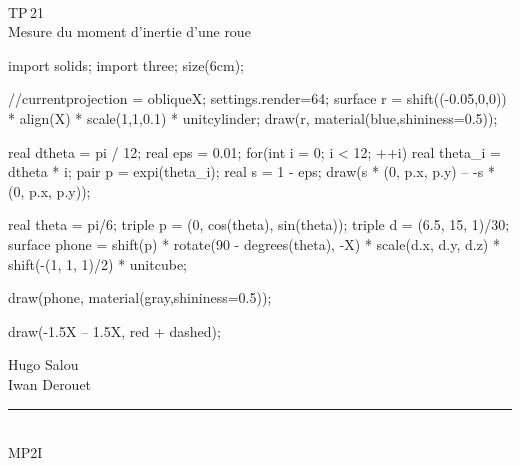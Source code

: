 \documentclass[a4paper]{report}
\begin{document}
	\begin{titlepage}
		\begin{center}
			~\\
			\vspace{4cm}
			{\Large \sc TP\,21}\\
			\vspace{1cm}
			{\HUGE \cursive Mesure du moment d'inertie d'une roue}\\
			\vfill
			\begin{adjustbox}{center}
				\begin{asy}
					import solids;
					import three;
					size(6cm);

					//currentprojection = obliqueX;
					settings.render=64;
					surface r = shift((-0.05,0,0)) * align(X) * scale(1,1,0.1) * unitcylinder;
					draw(r, material(blue,shininess=0.5));

					real dtheta = pi / 12;
					real eps = 0.01;
					for(int i = 0; i < 12; ++i) {
						real theta_i = dtheta * i;
						pair p = expi(theta_i);
						real s = 1 - eps;
						draw(s * (0, p.x, p.y) -- -s * (0, p.x, p.y));
					}

					real theta = pi/6;
					triple p = (0, cos(theta), sin(theta));
					triple d = (6.5, 15, 1)/30;
					surface phone = shift(p) * rotate(90 - degrees(theta), -X) * scale(d.x, d.y, d.z) * shift(-(1, 1, 1)/2) * unitcube;

					draw(phone, material(gray,shininess=0.5));

					draw(-1.5X -- 1.5X, red + dashed);
				\end{asy}
			\end{adjustbox}
			\vfill
			{Hugo {\sc Salou}\\Iwan {\sc Derouet}}\\
			\vspace{1.5mm}
			\rule{4cm}{0.4pt}\\
			\vspace{3.5mm}
			MP2I\\
		\end{center}
	\end{titlepage}
\end{document}

